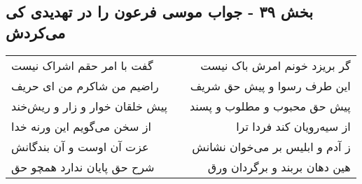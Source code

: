 \begin{center}
\section*{بخش ۳۹ - جواب موسی فرعون را در تهدیدی کی می‌کردش}
\label{sec:sh039}
\begin{longtable}{l p{0.5cm} r}
گفت با امر حقم اشراک نیست
&&
گر بریزد خونم امرش باک نیست
\\
راضیم من شاکرم من ای حریف
&&
این طرف رسوا و پیش حق شریف
\\
پیش خلقان خوار و زار و ریش‌خند
&&
پیش حق محبوب و مطلوب و پسند
\\
از سخن می‌گویم این ورنه خدا
&&
از سیه‌رویان کند فردا ترا
\\
عزت آن اوست و آن بندگانش
&&
ز آدم و ابلیس بر می‌خوان نشانش
\\
شرح حق پایان ندارد همچو حق
&&
هین دهان بربند و برگردان ورق
\\
\end{longtable}
\end{center}

